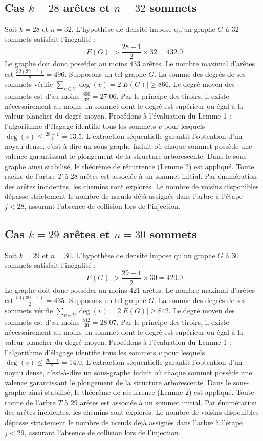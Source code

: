 \documentclass[12pt,a4paper]{article}
\begin{document}
\subsection{Cas $k = 28$ arêtes et $n = 32$ sommets}
Soit $k = 28$ et $n = 32$. L'hypothèse de densité impose qu'un graphe $G$ à 32 sommets satisfait l'inégalité :
$$ |E(G)| > \frac{28-1}{2} \times 32 = 432.0 $$
Le graphe doit donc posséder au moins $433$ arêtes. Le nombre maximal d'arêtes est $\frac{32(32-1)}{2} = 496$.
Supposons un tel graphe $G$. La somme des degrés de ses sommets vérifie $\sum_{v \in V} \deg(v) = 2|E(G)| \geq 866$.
Le degré moyen des sommets est d'au moins $\frac{866}{32} = 27.06$.
Par le principe des tiroirs, il existe nécessairement au moins un sommet dont le degré est supérieur ou égal à la valeur plancher du degré moyen.
Procédons à l'évaluation du Lemme 1 : l'algorithme d'élagage identifie tous les sommets $v$ pour lesquels $\deg(v) \leq \frac{28-1}{2} = 13.5$.
L'extraction séquentielle garantit l'obtention d'un noyau dense, c'est-à-dire un sous-graphe induit où chaque sommet possède une valence garantissant le plongement de la structure arborescente.
Dans le sous-graphe ainsi stabilisé, le théorème de récurrence (Lemme 2) est appliqué. Toute racine de l'arbre $T$ à 28 arêtes est associée à un sommet initial. Par énumération des arêtes incidentes, les chemins sont explorés. Le nombre de voisins disponibles dépasse strictement le nombre de nœuds déjà assignés dans l'arbre à l'étape $j < 28$, assurant l'absence de collision lors de l'injection.

\subsection{Cas $k = 29$ arêtes et $n = 30$ sommets}
Soit $k = 29$ et $n = 30$. L'hypothèse de densité impose qu'un graphe $G$ à 30 sommets satisfait l'inégalité :
$$ |E(G)| > \frac{29-1}{2} \times 30 = 420.0 $$
Le graphe doit donc posséder au moins $421$ arêtes. Le nombre maximal d'arêtes est $\frac{30(30-1)}{2} = 435$.
Supposons un tel graphe $G$. La somme des degrés de ses sommets vérifie $\sum_{v \in V} \deg(v) = 2|E(G)| \geq 842$.
Le degré moyen des sommets est d'au moins $\frac{842}{30} = 28.07$.
Par le principe des tiroirs, il existe nécessairement au moins un sommet dont le degré est supérieur ou égal à la valeur plancher du degré moyen.
Procédons à l'évaluation du Lemme 1 : l'algorithme d'élagage identifie tous les sommets $v$ pour lesquels $\deg(v) \leq \frac{29-1}{2} = 14.0$.
L'extraction séquentielle garantit l'obtention d'un noyau dense, c'est-à-dire un sous-graphe induit où chaque sommet possède une valence garantissant le plongement de la structure arborescente.
Dans le sous-graphe ainsi stabilisé, le théorème de récurrence (Lemme 2) est appliqué. Toute racine de l'arbre $T$ à 29 arêtes est associée à un sommet initial. Par énumération des arêtes incidentes, les chemins sont explorés. Le nombre de voisins disponibles dépasse strictement le nombre de nœuds déjà assignés dans l'arbre à l'étape $j < 29$, assurant l'absence de collision lors de l'injection.
\end{document}
